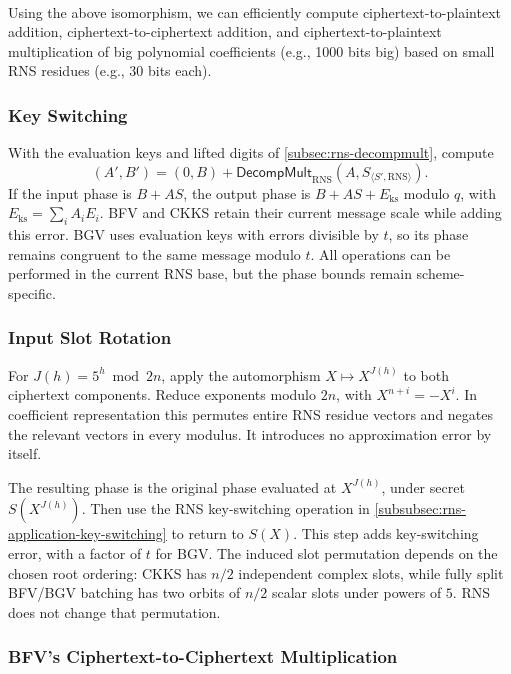 $ $

Using the above isomorphism, we can efficiently compute ciphertext-to-plaintext addition, ciphertext-to-ciphertext addition, and ciphertext-to-plaintext multiplication of big polynomial coefficients (e.g., 1000 bits big) based on small RNS residues (e.g., 30 bits each).


\subsubsection{Key Switching}
\label{subsubsec:rns-application-key-switching}

With the evaluation keys and lifted digits of \autoref{subsec:rns-decompmult}, compute
\[
(A',B')=(0,B)+\textsf{DecompMult}_{\mathrm{RNS}}(A,S_{\langle S',\mathrm{RNS}\rangle}).
\]
If the input phase is $B+AS$, the output phase is $B+AS+E_{\mathrm{ks}}$ modulo $q$, with $E_{\mathrm{ks}}=\sum_iA_iE_i$. BFV and CKKS retain their current message scale while adding this error. BGV uses evaluation keys with errors divisible by $t$, so its phase remains congruent to the same message modulo $t$. All operations can be performed in the current RNS base, but the phase bounds remain scheme-specific.


\subsubsection{Input Slot Rotation}
\label{subsubsec:rns-rotation}

For $J(h)=5^h\bmod2n$, apply the automorphism $X\mapsto X^{J(h)}$ to both ciphertext components. Reduce exponents modulo $2n$, with $X^{n+i}=-X^i$. In coefficient representation this permutes entire RNS residue vectors and negates the relevant vectors in every modulus. It introduces no approximation error by itself.

The resulting phase is the original phase evaluated at $X^{J(h)}$, under secret $S(X^{J(h)})$. Then use the RNS key-switching operation in \autoref{subsubsec:rns-application-key-switching} to return to $S(X)$. This step adds key-switching error, with a factor of $t$ for BGV. The induced slot permutation depends on the chosen root ordering: CKKS has $n/2$ independent complex slots, while fully split BFV/BGV batching has two orbits of $n/2$ scalar slots under powers of $5$. RNS does not change that permutation.

\subsubsection{BFV's Ciphertext-to-Ciphertext Multiplication}
\label{subsubsec:rns-cipher-mult-bfv}

